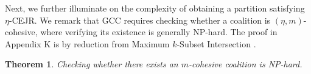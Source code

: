 \documentclass[letterpaper]{article} %
\newtheorem{theorem}{Theorem}
\begin{document}
Next, we further illuminate on the complexity of obtaining a partition satisfying $\eta$-CEJR. We remark that GCC requires checking whether a coalition is $(\eta, m)$-cohesive, where verifying its existence is generally NP-hard. The proof in Appendix K is by reduction from Maximum $k$-Subset Intersection \cite{xavier2012note}. 
\begin{theorem}
    \label{thm:cohesive np hard}
    Checking whether there exists an $m$-cohesive coalition is NP-hard.
\end{theorem}
\end{document}

